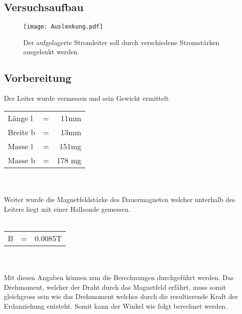 \documentclass{article}
\begin{document}
\subsection{Versuchsaufbau}
\begin{figure}[H]
	
	\texttt{[image: Auslenkung.pdf]} 
	\caption{Der aufgelagerte Stromleiter soll durch verschiedene Stromstärken ausgelenkt werden. }
\end{figure}
\subsection{Vorbereitung}
Der Leiter wurde vermessen und sein Gewicht ermittelt.\hspace{1cm}\\

\begin{tabular}{l l r}
	
	Länge l & =&11mm \\
	Breite b & =&13mm \\
	Masse l & =&151mg \\
	Masse b &=&178 mg	
\end{tabular}
\\\\
Weiter wurde die Magnetfeldstärke des Dauermagneten welcher unterhalb des Leiters liegt mit einer Hallsonde gemessen.\\\\
\begin{tabular}{l l r}
B & =&0.0085T	
\end{tabular}
\\\\
Mit diesen Angaben können nun die Berechnungen durchgeführt werden.
Das Drehmoment, welcher der Draht durch das Magnetfeld erfährt, muss somit gleichgross sein wie das Drehmoment welches durch die resultierende Kraft der Erdanziehung entsteht. Somit kann der Winkel wie folgt berechnet werden.
\end{document}
